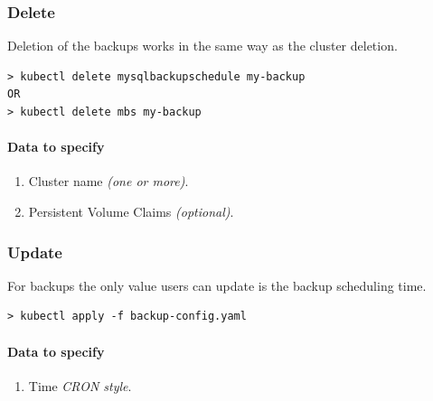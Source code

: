 \subsubsection*{Delete}

Deletion of the backups works in the same way as the cluster deletion.

\begin{lstlisting}
> kubectl delete mysqlbackupschedule my-backup
OR
> kubectl delete mbs my-backup
\end{lstlisting}

\paragraph{Data to specify}
\begin{enumerate}
	\item Cluster name \textit{(one or more)}.
	\item Persistent Volume Claims \textit{(optional)}.
\end{enumerate}

\subsubsection*{Update}

For backups the only value users can update is the backup 
scheduling time.

\begin{lstlisting}
> kubectl apply -f backup-config.yaml
\end{lstlisting}

\paragraph{Data to specify}
\begin{enumerate}
	\item Time \textit{CRON style}.
\end{enumerate}
